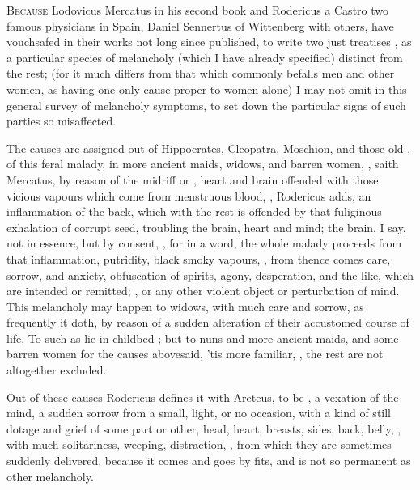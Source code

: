 {\lettrine{B}{ecause}  Lodovicus Mercatus in his second book
 and Rodericus a Castro
 two famous physicians
in Spain, Daniel Sennertus of Wittenberg  with others, have vouchsafed in their works not long since
published, to write two just treatises , as a particular species of melancholy (which
I have already specified) distinct from the rest; (for it
much differs from that which commonly befalls men and other women, as having
one only cause proper to women alone) I may not omit in this general survey of
melancholy symptoms, to set down the particular signs of such parties so
misaffected.

The causes are assigned out of Hippocrates, Cleopatra, Moschion, and those old
, of this feral malady, in more ancient maids,
widows, and barren women, , saith Mercatus,
by reason of the midriff or , heart and brain offended with
those vicious vapours which come from menstruous blood, , Rodericus adds, an inflammation of the back, which with
the rest is offended by that fuliginous exhalation of
corrupt seed, troubling the brain, heart and mind; the brain, I say, not in
essence, but by consent, , for in a word, the whole malady
proceeds from that inflammation, putridity, black smoky vapours, \etc{}, from
thence comes care, sorrow, and anxiety, obfuscation of spirits, agony,
desperation, and the like, which are intended or remitted; , or any other violent object or perturbation of mind. This
melancholy may happen to widows, with much care and sorrow, as frequently it
doth, by reason of a sudden alteration of their accustomed course of life,
\etc{} To such as lie in childbed ; but to nuns
and more ancient maids, and some barren women for the causes abovesaid, 'tis
more familiar, , the
rest are not altogether excluded.

Out of these causes Rodericus defines it with Areteus, to be , a vexation of the mind, a sudden sorrow from a small, light, or no
occasion, with a kind of still dotage and grief of some
part or other, head, heart, breasts, sides, back, belly, \etc{}, with much
solitariness, weeping, distraction, \etc{}, from which they are sometimes
suddenly delivered, because it comes and goes by fits, and is not so permanent
as other melancholy.

}
